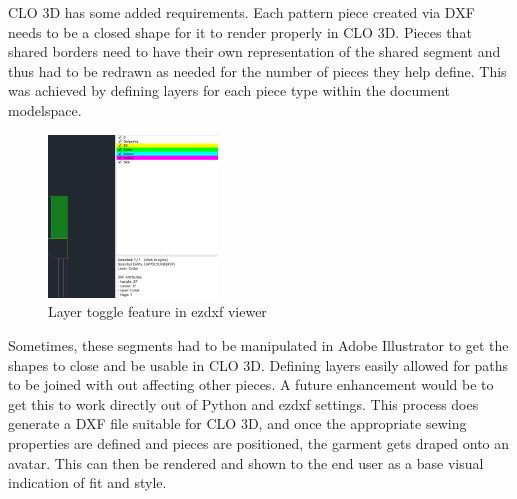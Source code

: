 CLO 3D has some added requirements. Each pattern piece created via DXF needs to be a closed shape for it to render properly in CLO 3D. Pieces that shared borders need to have their own representation of the shared segment and thus had to be redrawn as needed for the number of pieces they help define. This was achieved by defining layers for each piece type within the document modelspace.

\begin{figure} [H] %
    \centering %
    \includegraphics[width = 0.4\textwidth]{Images/dxf viewer.png} %
    \caption{Layer toggle feature in ezdxf viewer}
\end{figure}

Sometimes, these segments had to be manipulated in Adobe Illustrator to get the shapes to close and be usable in CLO 3D. Defining layers easily allowed for paths to be joined with out affecting other pieces. A future enhancement would be to get this to work directly out of Python and ezdxf settings. This process does generate a DXF file suitable for CLO 3D, and once the appropriate sewing properties are defined and pieces are positioned, the garment gets draped onto an avatar. This can then be rendered and shown to the end user as a base visual indication of fit and style.

